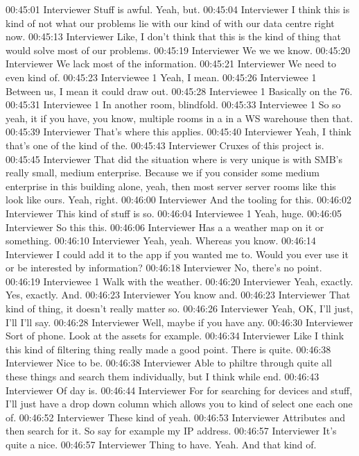 00:45:01 Interviewer
Stuff is awful. Yeah, but.
00:45:04 Interviewer
I think this is kind of not what our problems lie with our kind of with our data centre right now.
00:45:13 Interviewer
Like, I don't think that this is the kind of thing that would solve most of our problems.
00:45:19 Interviewer
We we we know.
00:45:20 Interviewer
We lack most of the information.
00:45:21 Interviewer
We need to even kind of.
00:45:23 Interviewee 1
Yeah, I mean.
00:45:26 Interviewee 1
Between us, I mean it could draw out.
00:45:28 Interviewee 1
Basically on the 76.
00:45:31 Interviewee 1
In another room, blindfold.
00:45:33 Interviewee 1
So so yeah, it if you have, you know, multiple rooms in a in a WS warehouse then that.
00:45:39 Interviewer
That's where this applies.
00:45:40 Interviewer
Yeah, I think that's one of the kind of the.
00:45:43 Interviewer
Cruxes of this project is.
00:45:45 Interviewer
That did the situation where is very unique is with SMB's really small, medium enterprise. Because we if you consider some medium enterprise in this building alone, yeah, then most server server rooms like this look like ours. Yeah, right.
00:46:00 Interviewer
And the tooling for this.
00:46:02 Interviewer
This kind of stuff is so.
00:46:04 Interviewee 1
Yeah, huge.
00:46:05 Interviewer
So this this.
00:46:06 Interviewer
Has a a weather map on it or something.
00:46:10 Interviewer
Yeah, yeah. Whereas you know.
00:46:14 Interviewer
I could add it to the app if you wanted me to. Would you ever use it or be interested by information?
00:46:18 Interviewer
No, there's no point.
00:46:19 Interviewee 1
Walk with the weather.
00:46:20 Interviewer
Yeah, exactly. Yes, exactly. And.
00:46:23 Interviewer
You know and.
00:46:23 Interviewer
That kind of thing, it doesn't really matter so.
00:46:26 Interviewer
Yeah, OK, I'll just, I'll I'll say.
00:46:28 Interviewer
Well, maybe if you have any.
00:46:30 Interviewer
Sort of phone. Look at the assets for example.
00:46:34 Interviewer
Like I think this kind of filtering thing really made a good point. There is quite.
00:46:38 Interviewer
Nice to be.
00:46:38 Interviewer
Able to philtre through quite all these things and search them individually, but I think while end.
00:46:43 Interviewer
Of day is.
00:46:44 Interviewer
For for searching for devices and stuff, I'll just have a drop down column which allows you to kind of select one each one of.
00:46:52 Interviewer
These kind of yeah.
00:46:53 Interviewer
Attributes and then search for it. So say for example my IP address.
00:46:57 Interviewer
It's quite a nice.
00:46:57 Interviewer
Thing to have. Yeah. And that kind of.
